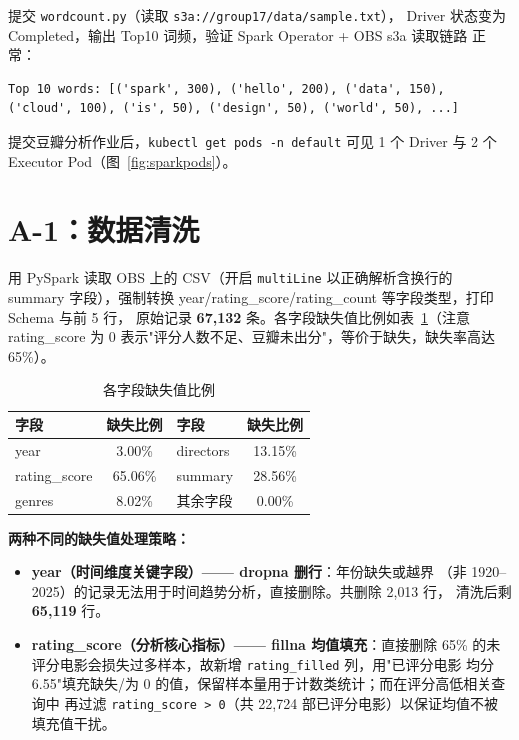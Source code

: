 提交 \lstinline!wordcount.py!（读取 \lstinline!s3a://group17/data/sample.txt!），
Driver 状态变为 Completed，输出 Top10 词频，验证 Spark Operator + OBS s3a 读取链路
正常：

\begin{lstlisting}[caption={WordCount 输出},captionpos=b]
Top 10 words: [('spark', 300), ('hello', 200), ('data', 150),
('cloud', 100), ('is', 50), ('design', 50), ('world', 50), ...]
\end{lstlisting}

提交豆瓣分析作业后，\lstinline!kubectl get pods -n default! 可见 1 个 Driver 与
2 个 Executor Pod（图~\ref{fig:sparkpods}）。


\section{A-1：数据清洗}

用 PySpark 读取 OBS 上的 CSV（开启 \lstinline!multiLine! 以正确解析含换行的 summary
字段），强制转换 year/rating\_score/rating\_count 等字段类型，打印 Schema 与前 5 行，
原始记录 \textbf{67{,}132} 条。各字段缺失值比例如表~\ref{tab:miss}（注意
rating\_score 为 0 表示"评分人数不足、豆瓣未出分"，等价于缺失，缺失率高达 65\%）。

\begin{table}[htbp]\centering
\caption{各字段缺失值比例}\label{tab:miss}
\begin{tabular}{lc lc}
\toprule
字段 & 缺失比例 & 字段 & 缺失比例 \\
\midrule
year         & 3.00\%  & directors    & 13.15\% \\
rating\_score & 65.06\% & summary      & 28.56\% \\
genres       & 8.02\%  & 其余字段     & 0.00\% \\
\bottomrule
\end{tabular}
\end{table}

\textbf{两种不同的缺失值处理策略：}
\begin{itemize}
  \item \textbf{year（时间维度关键字段）—— dropna 删行}：年份缺失或越界
  （非 1920--2025）的记录无法用于时间趋势分析，直接删除。共删除 2{,}013 行，
  清洗后剩 \textbf{65{,}119} 行。
  \item \textbf{rating\_score（分析核心指标）—— fillna 均值填充}：直接删除 65\%
  的未评分电影会损失过多样本，故新增 \lstinline!rating_filled! 列，用"已评分电影
  均分 6.55"填充缺失/为 0 的值，保留样本量用于计数类统计；而在评分高低相关查询中
  再过滤 \lstinline!rating_score > 0!（共 22{,}724 部已评分电影）以保证均值不被
  填充值干扰。
\end{itemize}

